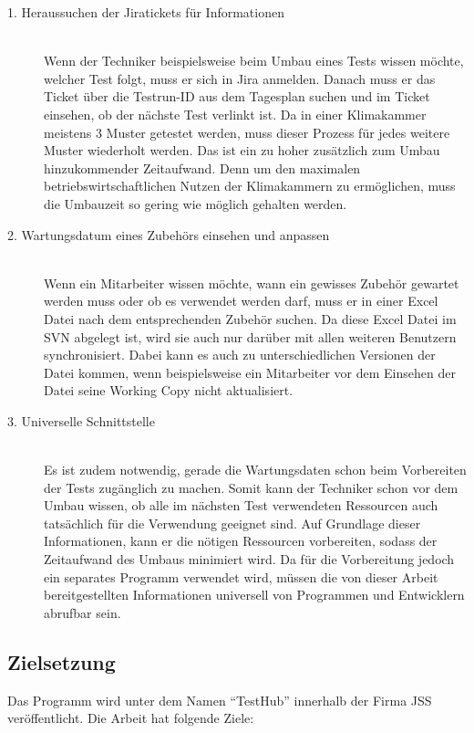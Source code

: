 \begin{description}

    \item[1. Heraussuchen der Jiratickets für Informationen]\hfill \\
    Wenn der Techniker beispielsweise beim Umbau eines Tests wissen möchte,
    welcher Test folgt, muss er sich in \gls{Jira} anmelden. Danach muss er das Ticket über die
    Testrun-ID aus dem Tagesplan suchen und im Ticket einsehen, ob der nächste 
    Test verlinkt ist. Da in einer Klimakammer meistens 3 Muster getestet werden,
    muss dieser Prozess für jedes weitere Muster wiederholt werden. Das ist ein 
    zu hoher zusätzlich zum Umbau hinzukommender Zeitaufwand. Denn um den maximalen
    betriebswirtschaftlichen Nutzen der Klimakammern zu ermöglichen, muss die 
    Umbauzeit so gering wie möglich gehalten werden.
    

    \item[2. Wartungsdatum eines Zubehörs einsehen und anpassen]\hfill \\
    Wenn ein Mitarbeiter wissen möchte, wann ein gewisses Zubehör gewartet werden muss oder ob 
    es verwendet werden darf, muss er in einer Excel Datei nach dem entsprechenden
    Zubehör suchen. Da diese Excel Datei im \gls{SVN} abgelegt ist, wird sie auch nur
    darüber mit allen weiteren Benutzern synchronisiert. Dabei kann es auch zu 
    unterschiedlichen Versionen der Datei kommen, wenn beispielsweise ein Mitarbeiter 
    vor dem Einsehen der Datei seine \gls{Working Copy} nicht aktualisiert.

    \item[3. Universelle Schnittstelle]\hfill \\
    Es ist zudem notwendig, gerade die Wartungsdaten schon beim Vorbereiten der Tests
    zugänglich zu machen. Somit kann der \gls{Techniker} schon vor dem Umbau wissen,
    ob alle im nächsten Test verwendeten Ressourcen auch tatsächlich für die 
    Verwendung geeignet sind.
    Auf Grundlage dieser Informationen, kann er die nötigen Ressourcen vorbereiten, sodass der
    Zeitaufwand des Umbaus minimiert wird.
    Da für die Vorbereitung jedoch ein separates Programm verwendet wird, müssen
    die von dieser Arbeit bereitgestellten Informationen universell von Programmen
    und Entwicklern abrufbar sein.
\end{description}

\newpage

\subsection{Zielsetzung}
Das Programm wird unter dem Namen ``TestHub'' innerhalb der Firma \gls{JSS} 
veröffentlicht. Die Arbeit hat folgende Ziele:

